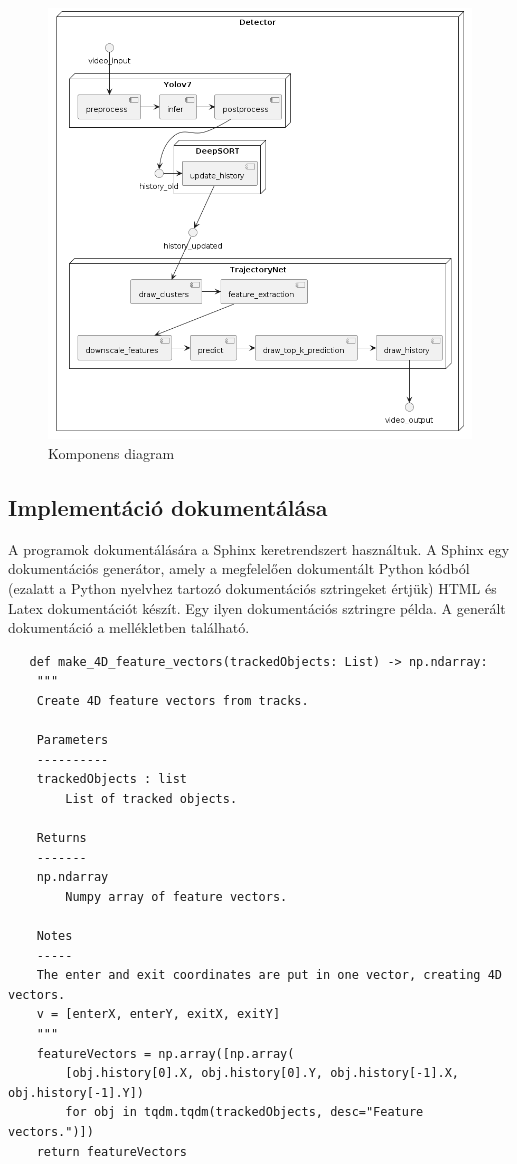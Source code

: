 \documentclass[12pt,a4paper]{article}
\begin{document}
\begin{figure}[H]
    \includegraphics[width=1\columnwidth]{ComponentDiagramDetection.png}
    \caption{Komponens diagram}
    \label{fig:ComponentDiagram}
\end{figure}


\newpage
\subsection{Implementáció dokumentálása}
A programok dokumentálására a Sphinx \cite{brandl2021sphinx} keretrendszert használtuk. A Sphinx egy dokumentációs generátor, amely a megfelelően dokumentált
Python kódból (ezalatt a Python nyelvhez tartozó dokumentációs sztringeket értjük) HTML és Latex dokumentációt készít. Egy ilyen dokumentációs sztringre példa.
A generált dokumentáció a mellékletben található.
\begin{verbatim}
   def make_4D_feature_vectors(trackedObjects: List) -> np.ndarray:
    """
    Create 4D feature vectors from tracks.

    Parameters
    ----------
    trackedObjects : list
        List of tracked objects.

    Returns
    -------
    np.ndarray
        Numpy array of feature vectors.

    Notes
    -----
    The enter and exit coordinates are put in one vector, creating 4D vectors.
    v = [enterX, enterY, exitX, exitY]
    """
    featureVectors = np.array([np.array(
        [obj.history[0].X, obj.history[0].Y, obj.history[-1].X, obj.history[-1].Y])
        for obj in tqdm.tqdm(trackedObjects, desc="Feature vectors.")])
    return featureVectors 
\end{verbatim}
\end{document}
